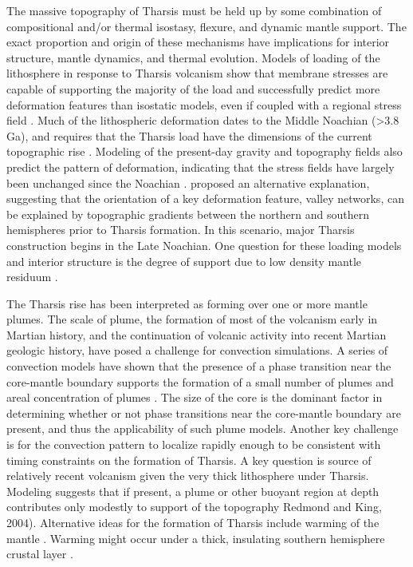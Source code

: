 The massive topography of Tharsis must be held up by some combination of compositional and/or thermal isostasy, flexure, and dynamic mantle support.  The exact proportion and origin of these mechanisms have implications for interior structure, mantle dynamics, and thermal evolution.  Models of loading of the lithosphere in response to Tharsis volcanism show that membrane stresses are capable of supporting the majority of the load \cite{Banerdt1982, Banerdt1992} and successfully predict more deformation features than isostatic models, even if coupled with a regional stress field \citep{Tanaka1991}.  Much of the lithospheric deformation dates to the Middle Noachian (\textgreater 3.8 Ga), and requires that the Tharsis load have the dimensions of the current topographic rise \cite{Phillips2001}.  Modeling of the present-day gravity and topography fields also predict the pattern of deformation, indicating that the stress fields have largely been unchanged since the Noachian \cite{Banerdt2000}. \citet{Bouley2016} proposed an alternative explanation, suggesting that the orientation of a key deformation feature, valley networks, can be explained by topographic gradients between the northern and southern hemispheres prior to Tharsis formation. In this scenario, major Tharsis construction begins in the Late Noachian.  One question for these loading models and interior structure is the degree of support due to low density mantle residuum \cite{Phillips1990}.

The Tharsis rise has been interpreted as forming over one or more mantle plumes.  The scale of plume, the formation of most of the volcanism early in Martian history, and the continuation of volcanic activity into recent Martian geologic history, have posed a challenge for convection simulations.  A series of convection models have shown that the presence of a phase transition near the core-mantle boundary supports the formation of a small number of plumes and areal concentration of plumes \citep{Harder1998,Harder2000,Harder1996,Breuer1998}. The size of the core is the dominant factor in determining whether or not phase transitions near the core-mantle boundary are present, and thus the applicability of such plume models. Another key challenge is for the convection pattern to localize rapidly enough to be consistent with timing constraints on the formation of Tharsis.  A key question is source of relatively recent volcanism given the very thick lithosphere under Tharsis. Modeling suggests that if present, a plume or other buoyant region at depth contributes only modestly to support of the topography \citep{Lowry2003,Zhong2003, Roberts2004, Redmond2004} Redmond and King, 2004).  Alternative ideas for the formation of Tharsis include warming of the mantle \cite{Solomon1982a}.  Warming might occur under a thick, insulating southern hemisphere crustal layer \cite{Wenzel2004}. 

